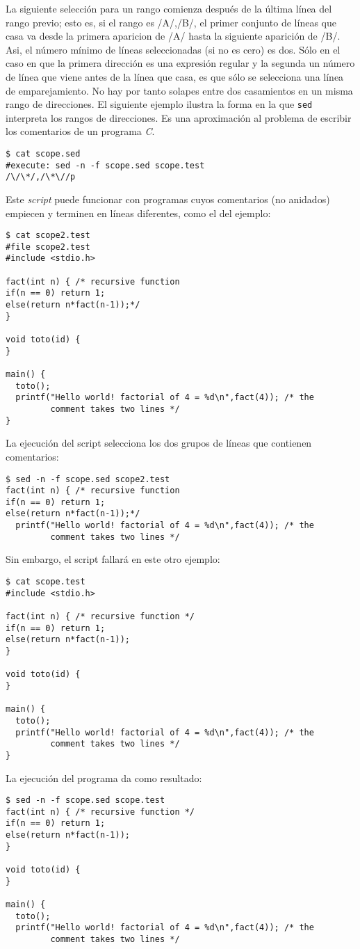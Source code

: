 La siguiente selección para un rango comienza después de la
última línea del rango previo; esto es, si el rango es /A/,/B/,
el primer conjunto de líneas que casa va desde la primera
aparicion de /A/ hasta la siguiente aparición de /B/. Asi,
el número mínimo de líneas seleccionadas (si no es cero)
es dos. Sólo en el caso en que la primera dirección es una
expresión regular y la segunda un número de línea que viene
antes de la línea que casa, es que sólo se selecciona una
línea de emparejamiento.  No hay por tanto solapes entre dos
casamientos en un misma rango de direcciones.  
El siguiente ejemplo ilustra la forma en la que \verb|sed| interpreta
los rangos de direcciones. Es una aproximación al problema de escribir
los comentarios de un programa {\it C}.
\begin{verbatim}
$ cat scope.sed
#execute: sed -n -f scope.sed scope.test
/\/\*/,/\*\//p
\end{verbatim}
Este {\it script} puede funcionar con programas cuyos
comentarios (no anidados) empiecen y terminen en líneas 
diferentes, como el del ejemplo:
\begin{verbatim}
$ cat scope2.test
#file scope2.test
#include <stdio.h>
 
fact(int n) { /* recursive function
if(n == 0) return 1;
else(return n*fact(n-1));*/
}
 
void toto(id) {
}
 
main() {
  toto();
  printf("Hello world! factorial of 4 = %d\n",fact(4)); /* the
         comment takes two lines */
}
\end{verbatim}
La ejecución del script selecciona los dos grupos de líneas
que contienen comentarios:
\begin{verbatim}
$ sed -n -f scope.sed scope2.test
fact(int n) { /* recursive function
if(n == 0) return 1;
else(return n*fact(n-1));*/
  printf("Hello world! factorial of 4 = %d\n",fact(4)); /* the
         comment takes two lines */  
\end{verbatim}
Sin embargo, el script fallará en este otro ejemplo:
\begin{verbatim}
$ cat scope.test
#include <stdio.h>
 
fact(int n) { /* recursive function */
if(n == 0) return 1;
else(return n*fact(n-1));
}
 
void toto(id) {
}
 
main() {
  toto();
  printf("Hello world! factorial of 4 = %d\n",fact(4)); /* the
         comment takes two lines */
}                     
\end{verbatim}
La ejecución del programa da como resultado:
\begin{verbatim}
$ sed -n -f scope.sed scope.test
fact(int n) { /* recursive function */
if(n == 0) return 1;
else(return n*fact(n-1));
}
 
void toto(id) {
}
 
main() {
  toto();
  printf("Hello world! factorial of 4 = %d\n",fact(4)); /* the
         comment takes two lines */      
\end{verbatim}

